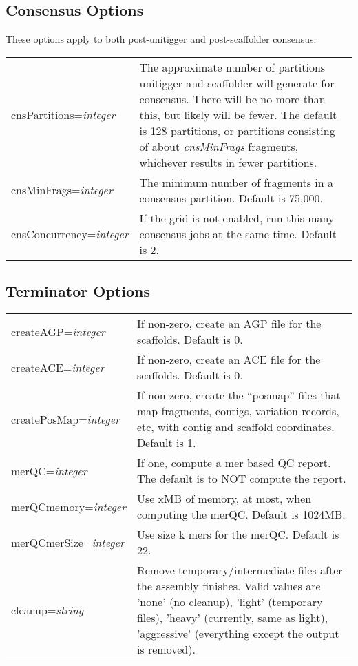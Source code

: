 \documentclass[twoside,11pt]{article}
\begin{document}
\subsection{Consensus Options}

These options apply to both post-unitigger and post-scaffolder consensus.

\begin{longtable}{lp{3.0in}}
cnsPartitions={\it integer} &
The approximate number of partitions unitigger and scaffolder will
generate for consensus.  There will be no more than this, but likely
will be fewer.  The default is 128 partitions, or partitions
consisting of about {\it cnsMinFrags} fragments, whichever results in fewer
partitions.
\\

cnsMinFrags={\it integer} &
The minimum number of fragments in a consensus partition.  Default
is 75,000.
\\

cnsConcurrency={\it integer} &
If the grid is not enabled, run this many consensus jobs at the same
time.  Default is 2.
\\
\end{longtable}


\subsection{Terminator Options}
\begin{longtable}{lp{3.0in}}
createAGP={\it integer} &
If non-zero, create an AGP file for the scaffolds.  Default is 0.
\\

createACE={\it integer} &
If non-zero, create an ACE file for the scaffolds.  Default is 0.
\\

createPosMap={\it integer} &
If non-zero, create the ``posmap'' files that map fragments, contigs,
variation records, etc, with contig and scaffold coordinates.  Default
is 1.
\\

merQC={\it integer} &
If one, compute a mer based QC report.  The default is to NOT compute the report.
\\

merQCmemory={\it integer} &
Use xMB of memory, at most, when computing the merQC.  Default is 1024MB.
\\

merQCmerSize={\it integer} &
Use size k mers for the merQC.  Default is 22.
\\

cleanup={\it string} &
Remove temporary/intermediate files after the assembly finishes.
Valid values are 'none' (no cleanup), 'light' (temporary files),
'heavy' (currently, same as light), 'aggressive' (everything except
the output is removed).
\\

\end{longtable}
\end{document}
